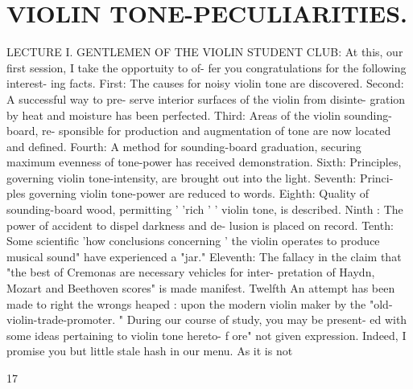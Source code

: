 \documentclass{article}
\begin{document}
\section*{VIOLIN TONE-PECULIARITIES.}
LECTURE I. GENTLEMEN OF THE VIOLIN STUDENT CLUB: At this, our first session, I take the opportuity to of- fer you congratulations for the following interest- ing facts. First: The causes for noisy violin tone are discovered. Second: A successful way to pre- serve interior surfaces of the violin from disinte- gration by heat and moisture has been perfected. Third: Areas of the violin sounding-board, re- sponsible for production and augmentation of tone are now located and defined. Fourth: A method for sounding-board graduation, securing maximum evenness of tone-power has received demonstration. Sixth: Principles, governing violin tone-intensity, are brought out into the light. Seventh: Princi- ples governing violin tone-power are reduced to words. Eighth: Quality of sounding-board wood, permitting ' 'rich ' ' violin tone, is described. Ninth : The power of accident to dispel darkness and de- lusion is placed on record. Tenth: Some scientific 'how conclusions concerning ' the violin operates to produce musical sound" have experienced a "jar." Eleventh: The fallacy in the claim that "the best of Cremonas are necessary vehicles for inter- pretation of Haydn, Mozart and Beethoven scores" is made manifest. Twelfth An attempt has been made to right the wrongs heaped : upon the modern violin maker by the "old- violin-trade-promoter. " During our course of study, you may be present- ed with some ideas pertaining to violin tone hereto- f ore" not given expression. Indeed, I promise you but little stale hash in our menu. As it is not

17
\end{document}
